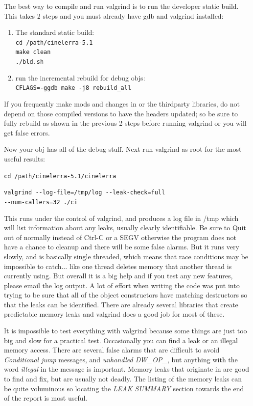 The best way to compile and run valgrind is to run the developer static build. This takes 2 steps and you must already have gdb and valgrind installed:

\begin{enumerate}[nosep]
	\item The standard static build:\\
		\texttt{cd /path/cinelerra-5.1}\\
		\texttt{make clean}\\
		\texttt{./bld.sh}
	\item run the incremental rebuild for debug objs:\\
		\texttt{CFLAGS=-ggdb make -j8 rebuild\_all}
\end{enumerate}

If you frequently make mods and changes in \CGG{} or the thirdparty libraries, do not depend on those
compiled versions to have the headers updated; so be sure to fully rebuild as shown in the previous 2
steps before running valgrind or you will get false errors.

Now your \CGG{} obj has all of the debug stuff. Next run valgrind as root for the most useful results:

\hspace{2em}\texttt{cd /path/cinelerra-5.1/cinelerra}

\hspace{2em}\texttt{valgrind -{}-log-file=/tmp/log -{}-leak-check=full\\
	-{}-num-callers=32 ./ci}

This runs \CGG{} under the control of valgrind, and produces a log file in /tmp which will list information about any leaks, usually clearly identifiable. Be sure to Quit out of \CGG{} normally instead of Ctrl-C or a SEGV otherwise the program does not have a chance to cleanup and there will be some false alarms. But it runs very slowly, and is basically single threaded, which means that race conditions may be impossible to catch$\dots$ like one thread deletes memory that another thread is currently using. But overall it is a big help and if you test any new features, please email the log output. A lot of effort when writing the code was put into trying to be sure that all of the object constructors have matching destructors so that the leaks can be identified. There are already several libraries that create predictable memory leaks and valgrind does a good job for most of these.

It is impossible to test everything with valgrind because some things are just too big and slow for a practical test. Occasionally you can find a leak or an illegal memory access. There are several false alarms that are difficult to avoid \textit{Conditional jump} messages, and \textit{unhandled DW\_OP\_}, but anything with the word \textit{illegal} in the message is important. Memory leaks that originate in \CGG{} are good to find and fix, but are usually not
deadly. The listing of the memory leaks can be quite voluminous so locating the \textit{LEAK SUMMARY} section
towards the end of the report is most useful.

